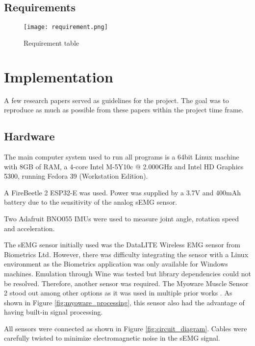 \subsection{Requirements}
\begin{figure}[htbp]
  \centering
  \texttt{[image: requirement.png]}
  \caption{Requirement table}
  \label{fig:requirements_table}
\end{figure}
\FloatBarrier

\section{Implementation}
A few research papers \cite{lu_development_2019,wu_neural-network-enhanced_2019,
wu_adaptive_2023,toro-ossaba_myoelectric_2024} served as guidelines for the project. 
The goal was to reproduce as much as possible from these papers within the project 
time frame.  

\subsection{Hardware}
The main computer system used to run all programs is a 64bit Linux machine with 
8GB of RAM, a 4-core Intel M-5Y10c @ 2.000GHz and Intel HD Graphics 5300, running 
Fedora 39 (Workstation Edition).  

A FireBeetle 2 ESP32-E was used. Power was supplied by a 3.7V and 400mAh battery 
due to the sensitivity of the analog sEMG sensor.

Two Adafruit BNO055 IMUs were used to measure joint angle, rotation speed 
and acceleration.  

The sEMG sensor initially used was the DataLITE Wireless EMG sensor from Biometrics 
Ltd. However, there was difficulty integrating the sensor with a Linux environment 
as the Biometrics application was only available for Windows machines. Emulation 
through Wine was tested but library dependencies could not be resolved. Therefore, 
another sensor was required. The Myoware Muscle Sensor 2 stood out among other options 
as it was used in multiple prior works \cite{lu_development_2019,wu_neural-network-enhanced_2019,
wu_adaptive_2023,russo_algorithm_2018}. As shown in Figure \ref{fig:myoware_processing}, 
this sensor also had the advantage of having built-in signal processing. 

All sensors were connected as shown in Figure \ref{fig:circuit_diagram}. Cables 
were carefully twisted to minimize electromagnetic noise in the sEMG signal.  

